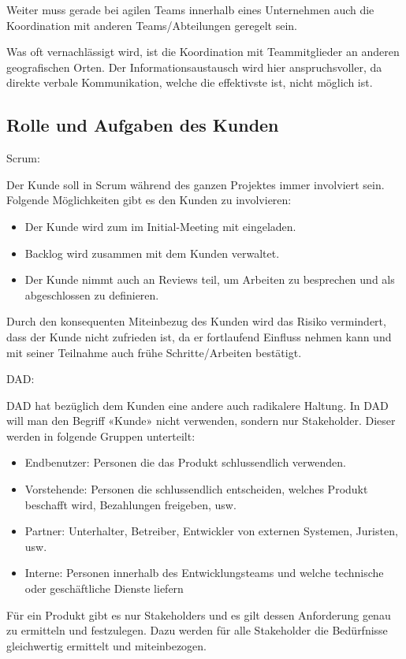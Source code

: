 Weiter muss gerade bei agilen Teams innerhalb eines Unternehmen auch die Koordination mit anderen Teams/Abteilungen geregelt sein.
\medskip

Was oft vernachlässigt wird, ist die Koordination mit Teammitglieder an anderen geografischen Orten. Der Informationsaustausch wird hier anspruchsvoller, da direkte verbale Kommunikation, welche die effektivste ist, nicht möglich ist.


\subsection{Rolle und Aufgaben des Kunden}

{\Large Scrum:} \cite{planningPrioScrum} \medskip

Der Kunde soll in Scrum während des ganzen Projektes immer involviert sein. Folgende Möglichkeiten gibt es den Kunden zu involvieren:
\begin{itemize}
	\item Der Kunde wird zum im Initial-Meeting mit eingeladen.
	\item Backlog wird zusammen mit dem Kunden verwaltet.
	\item Der Kunde nimmt auch an Reviews teil, um Arbeiten zu besprechen und als abgeschlossen zu definieren.
\end{itemize}
Durch den konsequenten Miteinbezug des Kunden wird das Risiko vermindert, dass der Kunde nicht zufrieden ist, da er fortlaufend Einfluss nehmen kann und mit seiner Teilnahme auch frühe Schritte/Arbeiten bestätigt.
\bigskip 

{\Large DAD:} \cite{planningPrioDad} \medskip

DAD hat bezüglich dem Kunden eine andere auch radikalere Haltung. In DAD will man den Begriff «Kunde» nicht verwenden, sondern nur Stakeholder. Dieser werden in folgende Gruppen unterteilt:
\begin{itemize}
	\item Endbenutzer: Personen die das Produkt schlussendlich verwenden.
	\item Vorstehende: Personen die schlussendlich entscheiden, welches Produkt beschafft wird, Bezahlungen freigeben, usw.
	\item Partner: Unterhalter, Betreiber, Entwickler von externen Systemen, Juristen, usw.
	\item Interne: Personen innerhalb des Entwicklungsteams und welche technische oder geschäftliche Dienste liefern
\end{itemize}
Für ein Produkt gibt es nur Stakeholders und es gilt dessen Anforderung genau zu ermitteln und festzulegen. Dazu werden für alle Stakeholder die Bedürfnisse gleichwertig ermittelt und miteinbezogen. \smallskip

